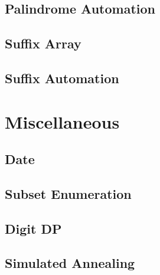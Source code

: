 \subsection{Palindrome Automation}
\raggedbottom
\hrulefill
\subsection{Suffix Array}
\raggedbottom
\hrulefill
\subsection{Suffix Automation}
\raggedbottom
\hrulefill

\section{Miscellaneous}
\subsection{Date}
\raggedbottom
\hrulefill
\subsection{Subset Enumeration}
\raggedbottom
\hrulefill
\subsection{Digit DP}
\raggedbottom
\hrulefill
\subsection{Simulated Annealing}
\raggedbottom
\hrulefill
